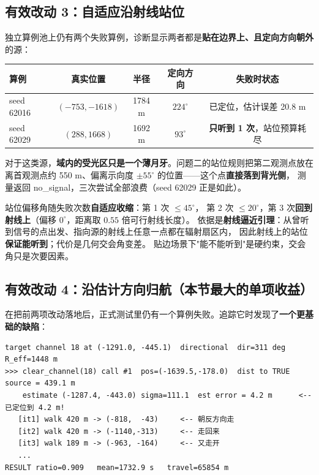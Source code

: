 \subsection{有效改动 3：自适应沿射线站位}

独立算例池上仍有两个失败算例，诊断显示两者都是\textbf{贴在边界上、且定向方向朝外}的源：

\begin{center}
\begin{tabular}{lcccc}
\toprule
算例 & 真实位置 & 半径 & 定向方向 & 失败时状态 \\ \midrule
seed 62016 & $(-753,-1618)$ & 1784 m & $224^{\circ}$ & 已定位，估计误差 20.8 m \\
seed 62029 & $(288,1668)$ & 1692 m & $93^{\circ}$ & \textbf{只听到 1 次}，站位预算耗尽 \\
\bottomrule
\end{tabular}
\end{center}

对于这类源，\textbf{域内的受光区只是一个薄月牙}。问题二的站位规则把第二观测点放在
离首观测点约 550 m、偏离示向度 $\pm55^{\circ}$ 的位置——这个点\textbf{直接落到背光侧}，
测量返回 no\_signal，三次尝试全部浪费（seed 62029 正是如此）。

\begin{keybox}[title=改动]
站位偏移角随失败次数\textbf{自适应收缩}：第 1 次 $\le45^{\circ}$，
第 2 次 $\le20^{\circ}$，第 3 次\textbf{回到射线上}（偏移 $0^{\circ}$，距离取 $0.55$ 倍可行射线长度）。
依据是\textbf{射线逼近引理}：从曾听到信号的点出发、指向源的射线上任意一点都在辐射扇区内，
因此射线上的站位\textbf{保证能听到}；代价是几何交会角变差。
贴边场景下"能不能听到"是硬约束，交会角只是次要因素。
\end{keybox}

\subsection{有效改动 4：沿估计方向归航（本节最大的单项收益）}

在把前两项改动落地后，正式测试里仍有一个算例失败。追踪它时发现了\textbf{一个更基础的缺陷}：

\begin{lstlisting}[caption={案例 seed 910001、频道 18 的归航轨迹（修复前）}]
target channel 18 at (-1291.0, -445.1)  directional  dir=311 deg  R_eff=1448 m
>>> clear_channel(18) call #1  pos=(-1639.5,-178.0)  dist to TRUE source = 439.1 m
    estimate (-1287.4, -443.0) sigma=111.1  est error = 4.2 m      <-- 已定位到 4.2 m!
   [it1] walk 420 m -> (-818,  -43)     <-- 朝反方向走
   [it2] walk 420 m -> (-1140,-313)     <-- 走回来
   [it3] walk 189 m -> (-963, -164)     <-- 又走开
   ...
RESULT ratio=0.909   mean=1732.9 s   travel=65854 m
\end{lstlisting}

